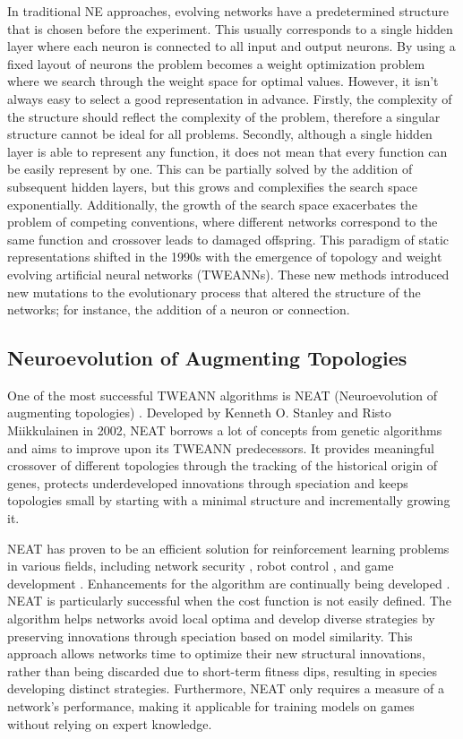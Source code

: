 \documentclass[letterpaper, 12pt]{article}
\begin{document}
In traditional NE approaches, evolving networks have a predetermined structure that is
chosen before the experiment. This usually corresponds to a single hidden layer where
each neuron is connected to all input and output neurons. By using a fixed layout of
neurons the problem becomes a weight optimization problem where we search through the
weight space for optimal values. However, it isn't always easy to select a good
representation in advance. Firstly, the complexity of the structure should reflect the
complexity of the problem, therefore a singular structure cannot be ideal for all
problems. Secondly, although a single hidden layer is able to represent any function, it
does not mean that every function can be easily represent by one. This can be partially
solved by the addition of subsequent hidden layers, but this grows and complexifies the
search space exponentially. Additionally, the growth of the search space exacerbates the
problem of competing conventions, where different networks correspond to the same
function and crossover leads to damaged offspring. This paradigm of static
representations shifted in the 1990s with the emergence of topology and weight evolving
artificial neural networks (TWEANNs). These new methods introduced new mutations to the
evolutionary process that altered the structure of the networks; for instance, the
addition of a neuron or connection.

\subsection{Neuroevolution of Augmenting Topologies}
One of the most successful TWEANN algorithms is NEAT (Neuroevolution of augmenting
topologies) \cite{stanley:ec02}. Developed by Kenneth O. Stanley and Risto Miikkulainen
in 2002, NEAT borrows a lot of concepts from genetic algorithms \cite{lamangup} and aims
to improve upon its TWEANN predecessors. It provides meaningful crossover of different
topologies through the tracking of the historical origin of genes, protects
underdeveloped innovations through speciation and keeps topologies small by starting
with a minimal structure and incrementally growing it. 

NEAT has proven to be an efficient solution for reinforcement learning problems in
various fields, including network security \cite{zhuka2024}, robot control
\cite{silva2012}, and game development \cite{hasting2009, hind2024}. Enhancements for
the algorithm are continually being developed \cite{ambrosio2014, merrild1017}. NEAT is
particularly successful when the cost function is not easily defined. The algorithm
helps networks avoid local optima and develop diverse strategies by preserving
innovations through speciation based on model similarity. This approach allows networks
time to optimize their new structural innovations, rather than being discarded due to
short-term fitness dips, resulting in species developing distinct strategies.
Furthermore, NEAT only requires a measure of a network's performance, making it
applicable for training models on games without relying on expert knowledge.
\end{document}
